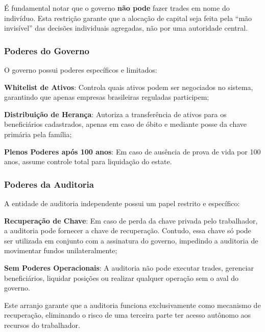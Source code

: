 É fundamental notar que o governo \textbf{não pode} fazer trades em nome do indivíduo. Esta restrição garante que a alocação de capital seja feita pela ``mão invisível'' das decisões individuais agregadas, não por uma autoridade central.

\subsubsection{Poderes do Governo}

O governo possui poderes específicos e limitados:

\begin{alineas}
    \item \textbf{Whitelist de Ativos}: Controla quais ativos podem ser negociados no sistema, garantindo que apenas empresas brasileiras reguladas participem;
    \item \textbf{Distribuição de Herança}: Autoriza a transferência de ativos para os beneficiários cadastrados, apenas em caso de óbito e mediante posse da chave primária pela família;
    \item \textbf{Plenos Poderes após 100 anos}: Em caso de ausência de prova de vida por 100 anos, assume controle total para liquidação do estate.
\end{alineas}

\subsubsection{Poderes da Auditoria}

A entidade de auditoria independente possui um papel restrito e específico:

\begin{alineas}
    \item \textbf{Recuperação de Chave}: Em caso de perda da chave privada pelo trabalhador, a auditoria pode fornecer a chave de recuperação. Contudo, essa chave só pode ser utilizada em conjunto com a assinatura do governo, impedindo a auditoria de movimentar fundos unilateralmente;
    \item \textbf{Sem Poderes Operacionais}: A auditoria não pode executar trades, gerenciar beneficiários, liquidar posições ou realizar qualquer operação sem o aval do governo.
\end{alineas}

Este arranjo garante que a auditoria funciona exclusivamente como mecanismo de recuperação, eliminando o risco de uma terceira parte ter acesso autônomo aos recursos do trabalhador.

